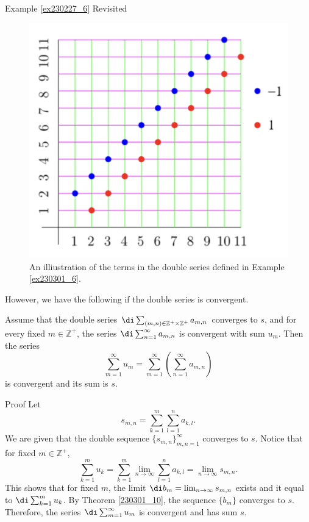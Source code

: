 \begin{example}{\linkt Example \ref{ex230227_6} Revisited}
\begin{example}[label=ex230227_13]{}
\begin{example}{}
\begin{example}[label=ex230301_6]{}
\begin{figure}[ht]
\centering
\includegraphics[scale=0.2]{Picture50.png}
\caption{An illiustration of the terms in the double series defined in Example \ref{ex230301_6}.\fa}\label{figure50}
\end{figure}

However, we have the following if the double series is convergent.
\begin{theorem}[label=230302_8]
{}
Assume that the double series $\di\sum_{(m,n)\in\mathbb{Z}^+\times\mathbb{Z}^+}a_{m,n}$ converges to $s$, and for every fixed $m\in\mathbb{Z}^+$, the series
$\di\sum_{n=1}^{\infty}a_{m,n}$ is convergent with sum $u_m$. Then the series \[\sum_{m=1}^{\infty}u_m=\sum_{m=1}^{\infty}\left(\sum_{n=1}^{\infty}a_{m,n}\right)\] is convergent and its sum is $s$.
\end{theorem}
\begin{myproof}{Proof}
  Let 
\[s_{m,n}=\sum_{k=1}^m\sum_{l=1}^na_{k,l}.\]  We are given that the double sequence $\{s_{m,n}\}_{m,n=1}^{\infty}$ converges to $s$. Notice that for fixed $m\in\mathbb{Z}^+$,
\[\sum_{k=1}^m u_k=\sum_{k=1}^m \lim_{n\to\infty}\sum_{l=1}^na_{k,l} =\lim_{n\to\infty}s_{m,n}.\] This shows that for fixed $m$, the limit $\di b_m= \lim_{n\to\infty}s_{m,n} $ exists and it equal to $\di\sum_{k=1}^m u_k$.
By Theorem \ref{230301_10}, the sequence $\{b_m\}$ converges to $s$. Therefore, the series $\di\sum_{m=1}^{\infty}u_m$ is convergent and has sum $s$.
\end{myproof}


\end{example}
\end{example}
\end{example}
\end{example}
